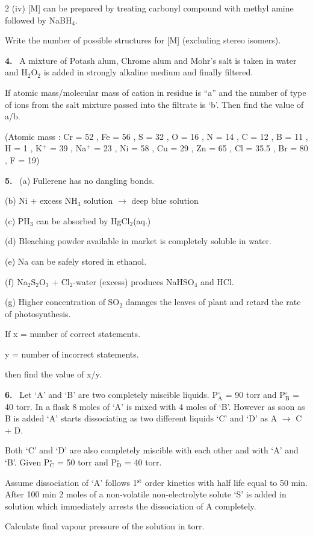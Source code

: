 \documentclass[10pt]{extarticle}
\newcommand{\qn}[1]{\par\smallskip\noindent\textbf{#1.}~}
\begin{document}
\begin{multicols}{2}
(iv) [M] can be prepared by treating carbonyl compound with methyl amine followed by NaBH$_4$.\par
Write the number of possible structures for [M] (excluding stereo isomers).
\qn{4} A mixture of Potash alum, Chrome alum and Mohr's salt is taken in water and H$_2$O$_2$ is added in strongly alkaline medium and finally filtered.\par
If atomic mass/molecular mass of cation in residue is ``a'' and the number of type of ions from the salt mixture passed into the filtrate is `b'. Then find the value of a/b.\par
(Atomic mass : Cr = 52 , Fe = 56 , S = 32 , O = 16 , N = 14 , C = 12 , B = 11 , H = 1 , K$^+$ = 39 , Na$^+$ = 23 , Ni = 58 , Cu = 29 , Zn = 65 , Cl = 35.5 , Br = 80 , F = 19)
\qn{5} (a) Fullerene has no dangling bonds.\par
(b) Ni + excess NH$_3$ solution $\longrightarrow$ deep blue solution\par
(c) PH$_3$ can be absorbed by HgCl$_2$(aq.)\par
(d) Bleaching powder available in market is completely soluble in water.\par
(e) Na can be safely stored in ethanol.\par
(f) Na$_2$S$_2$O$_3$ + Cl$_2$-water (excess) produces NaHSO$_4$ and HCl.\par
(g) Higher concentration of SO$_2$ damages the leaves of plant and retard the rate of photosynthesis.\par
If x = number of correct statements.\par
y = number of incorrect statements.\par
then find the value of x/y.
\qn{6} Let `A' and `B' are two completely miscible liquids. P$^\circ_\mathrm A$ = 90 torr and P$^\circ_\mathrm B$ = 40 torr. In a flask 8 moles of `A' is mixed with 4 moles of `B'. However as soon as B is added `A' starts dissociating as two different liquids `C' and `D' as A $\longrightarrow$ C + D.\par
Both `C' and `D' are also completely miscible with each other and with `A' and `B'. Given P$^\circ_\mathrm C$ = 50 torr and P$^\circ_\mathrm D$ = 40 torr.\par
Assume dissociation of `A' follows 1$^{\mathrm{st}}$ order kinetics with half life equal to 50 min. After 100 min 2 moles of a non-volatile non-electrolyte solute `S' is added in solution which immediately arrests the dissociation of A completely.\par
Calculate final vapour pressure of the solution in torr.

\end{multicols}
\end{document}
